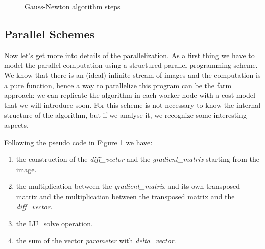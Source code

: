 \begin{figure}[h]
\centering
{}
\caption{Gauss-Newton algorithm steps}
\end{figure}
\subsection{Parallel Schemes}

Now let's get more into details of the parallelization.
As a first thing we have to model the parallel computation using a structured parallel programming scheme. 
We know that there is an (ideal) infinite stream of images and the computation is a pure function, hence a way to parallelize this program can be the farm approach: we can replicate the algorithm in each worker node with a cost model that we will introduce soon. 
For this scheme is not necessary to know the internal structure of the algorithm, but if we analyse it, we recognize some interesting aspects.

Following the pseudo code in Figure 1 we have:
\begin{enumerate}
\item the construction of the \textit{diff\_vector} and the \textit{gradient\_matrix} starting from the image.
\item the multiplication between the \textit{gradient\_matrix} and its own transposed matrix and  the multiplication between the transposed matrix and the \textit{diff\_vector}.
\item the LU\_solve operation.
\item the sum of the vector \textit{parameter} with \textit{delta\_vector}.
\end{enumerate}

